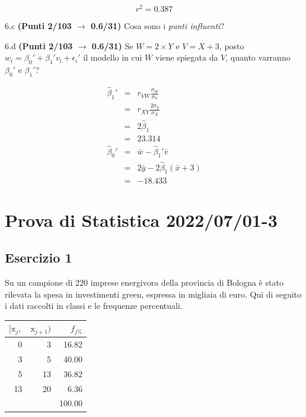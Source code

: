 \documentclass[
  11pt,
]{book}
\theoremstyle{mytheoremstyle}
\theoremstyle{mydefstyle}
\newenvironment{sol}
  {
  \begin{tcolorbox}[enhanced,breakable,arc=0.1mm,boxrule=1pt,colback=white,colframe=iblue,
  title=\bf \fontfamily{lmss}\selectfont \hspace{.5 cm} Soluzione,drop fuzzy shadow]

}{
\end{tcolorbox}
  }
\begin{document}
\[r^2=0.387\]

6.c \textbf{(Punti 2/103 \(\rightarrow\) 0.6/31)} Cosa sono i \emph{punti influenti}?

6.d \textbf{(Punti 2/103 \(\rightarrow\) 0.6/31)} Se \(W=2\times Y\) e \(V=X+3\), posto \(w_i=\beta_0'+\beta_1'v_ì +\epsilon_i'\)
il modello in cui \(W\) viene spiegata da \(V\), quanto varranno \(\beta_0'\) e \(\beta_1'\)?

\begin{sol}
\begin{eqnarray*}
   \hat\beta_1' &=&  r_{VW}\frac{\sigma_W}{\sigma_V} \\
            &=&  r_{XY}\frac{2\sigma_Y}{\sigma_X} \\
            &=& 2\hat\beta_1\\
            &=& 23.314\\
  \hat\beta_0' &=& \bar w - \hat\beta_1'\bar v\\
            &=& 2\bar y-2\hat\beta_1(\bar x + 3)\\
            &=& -18.433
\end{eqnarray*}

\end{sol}

\section{Prova di Statistica 2022/07/01-3}\label{prova-di-statistica-20220701-3}

\subsection{Esercizio 1}\label{esercizio-1-16}

Su un campione di \(220\) imprese energivora della provincia di Bologna è stato
rilevata la spesa in investimenti green, espressa in migliaia di euro. Qui di seguito i dati raccolti in classi
e le frequenze percentuali.

\begin{table}[H]
\centering
\begin{tabular}{rrr}
\toprule
$[\text{x}_j,$ & $\text{x}_{j+1})$ & $f_{j\%}$\\
\midrule
0 & 3 & 16.82\\
3 & 5 & 40.00\\
5 & 13 & 36.82\\
13 & 20 & 6.36\\
 &  & 100.00\\
\bottomrule
\end{tabular}
\end{table}
\end{document}

